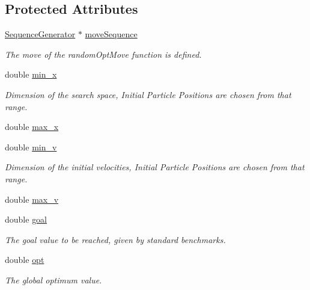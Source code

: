 \subsection*{Protected Attributes}
\begin{CompactItemize}
\item 
\hyperlink{classSequenceGenerator}{SequenceGenerator} $\ast$ \hyperlink{classFunction_145da37ba2e1e9db056f7227328ee37f}{moveSequence}
\begin{CompactList}\small\item\em The move of the randomOptMove function is defined. \item\end{CompactList}\item 
double \hyperlink{classFunction_944697d89610cf8194f1abc9d559b572}{min\_\-x}
\begin{CompactList}\small\item\em Dimension of the search space, Initial Particle Positions are chosen from that range. \item\end{CompactList}\item 
double \hyperlink{classFunction_aa409aec3c3c38af95f5c547bfc3d18c}{max\_\-x}
\item 
double \hyperlink{classFunction_4c842a8625fcb505a1bfcf17e28f4b7f}{min\_\-v}
\begin{CompactList}\small\item\em Dimension of the initial velocities, Initial Particle Positions are chosen from that range. \item\end{CompactList}\item 
double \hyperlink{classFunction_bacb7d7b30e0f52bcbe2cad07dfe9644}{max\_\-v}
\item 
double \hyperlink{classFunction_d9eec4e429707542493d16d83fcb7f54}{goal}
\begin{CompactList}\small\item\em The goal value to be reached, given by standard benchmarks. \item\end{CompactList}\item 
double \hyperlink{classFunction_0c7fe836998b27944251c57106ddad72}{opt}
\begin{CompactList}\small\item\em The global optimum value. \item\end{CompactList}\item 

\end{CompactItemize}
